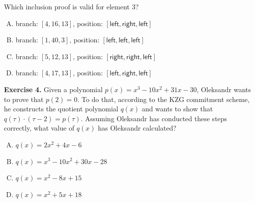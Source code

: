 \documentclass{zkdl-tests-template}
\begin{document}
Which inclusion proof is valid for element $3$?

\begin{enumerate}[(A)]
    \item branch: $[4, 16, 13]$, position: $[\mathsf{left}, \mathsf{right}, \mathsf{left}]$
    \item branch: $[1, 40, 3]$, position: $[\mathsf{left}, \mathsf{left}, \mathsf{left}]$
    \item branch: $[5, 12, 13]$, position: $[\mathsf{right}, \mathsf{right}, \mathsf{left}]$
    \item branch: $[4, 17, 13]$, position: $[\mathsf{left}, \mathsf{right}, \mathsf{left}]$
\end{enumerate}

\textbf{Exercise 4.} Given a polynomial $p(x) = x^3 - 10x^2 + 31x - 30$, Oleksandr wants to prove that $p(2)=0$. 
To do that, according to the KZG commitment scheme, he constructs the quotient polynomial $q(x)$ and wants 
to show that $q(\tau) \cdot (\tau - 2) = p(\tau)$. Assuming Oleksandr has conducted these steps correctly, 
what value of $q(x)$ has Oleksandr calculated?

\begin{enumerate}[(A)]
    \item $q(x) = 2x^2 + 4x - 6$
    \item $q(x) = x^3 - 10x^2 + 30x - 28$
    \item $q(x) = x^2 - 8x + 15$
    \item $q(x) = x^2 + 5x + 18$
\end{enumerate}
\end{document}
